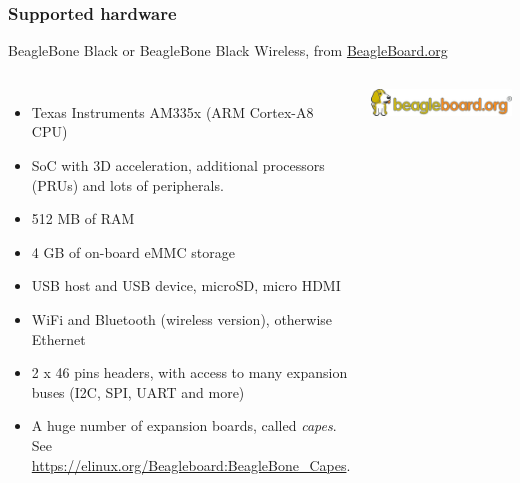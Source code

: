 \begin{frame}
\frametitle{Supported hardware}
  BeagleBone Black or BeagleBone Black Wireless, from
\href{https://beagleboard.org}{BeagleBoard.org}
  \begin{columns}
    \footnotesize
    \begin{itemize}
      \item Texas Instruments AM335x (ARM Cortex-A8 CPU)
      \item SoC with 3D acceleration, additional processors
        (PRUs) and lots of peripherals.
      \item 512 MB of RAM
      \item 4 GB of on-board eMMC storage
      \item USB host and USB device, microSD, micro HDMI
      \item WiFi and Bluetooth (wireless version), otherwise Ethernet
      \item 2 x 46 pins headers, with access to many expansion buses
        (I2C, SPI, UART and more)
      \item A huge number of expansion boards, called {\em capes}.
        See \url{https://elinux.org/Beagleboard:BeagleBone_Capes}.
    \end{itemize}
    \begin{center}
      \includegraphics[width=\textwidth]{slides/beagleboneblack-board/beagle_logo_326x60.png}\\

\end{center}
\end{columns}
\end{frame}
